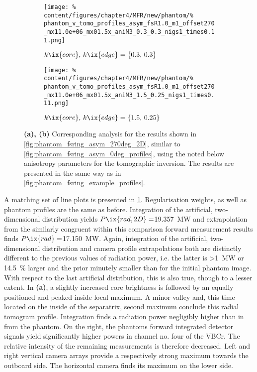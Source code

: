                 \begin{figure}[t]%
                    \centering%
                    \begin{subfigure}{\textwidth}%
                        \centering%
                        \texttt{[image: \%
                            content/figures/chapter4/MFR/new/phantom/\%
                            phantom\_v\_tomo\_profiles\_asym\_fsR1.0\_m1\_offset270\_mx11.0e+06\_mx01.5x\_aniM3\_0.3\_0.3\_nigs1\_times0.11.png]}%
                        \caption{$k\ix{core},\,k\ix{edge}=\left\{0.3,\,0.3\right\}$}%
                    \end{subfigure}%
                    \newline%
                    \begin{subfigure}{\textwidth}%
                        \centering%
                        \texttt{[image: \%
                            content/figures/chapter4/MFR/new/phantom/\%
                            phantom\_v\_tomo\_profiles\_asym\_fsR1.0\_m1\_offset270\_mx11.0e+06\_mx01.5x\_aniM3\_1.5\_0.25\_nigs1\_times0.11.png]}%
                        \caption{$k\ix{core},\,k\ix{edge}=\left\{1.5,\,0.25\right\}$}%
                    \end{subfigure}%
                    \caption{\textbf{(a), (b)} Corresponding analysis for the results shown in \cref{fig:phantom_fsring_asym_270deg_2D}, similar to \cref{fig:phantom_fsring_asym_0deg_profiles}, using the noted below anisotropy parameters for the tomographic inversion. The results are presented in the same way as in \cref{fig:phantom_fsring_example_profiles}.}\label{fig:phantom_fsring_asym_270deg_profiles}%
                \end{figure}%
%
                A matching set of line plots is presented in \cref{fig:phantom_fsring_asym_270deg_profiles}. Regularisation weights, as well as phantom profiles are the same as before. Integration of the artificial, two-dimensional distribution yields $P\ix{rad,2D}=$\SI{19.357}{\mega\watt} and extrapolation from the similarly congruent within this comparison forward measurement results finds $P\ix{rad}=$\SI{17.150}{\mega\watt}. Again, integration of the artificial, two-dimensional distribution and camera profile extrapolations both are distinctly different to the previous values of radiation power, i.e. the latter is >\SI{1}{\mega\watt} or \SI{14.5}{\percent} larger and the prior minutely smaller than for the initial phantom image. With respect to the last artificial distribution, this is also true, though to a lesser extent. In \textbf{(a)}, a slightly increased core brightness is followed by an equally positioned and peaked inside local maximum. A minor valley and, this time located on the inside of the separatrix, second maximum conclude this radial tomogram profile. Integration finds a radiation power negligibly higher than in from the phantom. On the right, the phantoms forward integrated detector signals yield significantly higher powers in channel no. four of the VBCr. The relative intensity of the remaining measurements is therefore decreased. Left and right vertical camera arrays provide a respectively strong maximum towards the outboard side. The horizontal camera finds its maximum on the lower side.\\%
